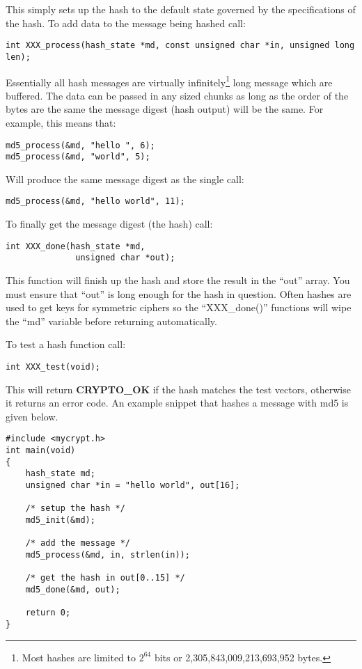 \documentclass[b5paper]{book}
\begin{document}
This simply sets up the hash to the default state governed by the specifications of the hash.  To add data to the 
message being hashed call:
\begin{verbatim}
int XXX_process(hash_state *md, const unsigned char *in, unsigned long len);
\end{verbatim}

Essentially all hash messages are virtually infinitely\footnote{Most hashes are limited to $2^{64}$ bits or 2,305,843,009,213,693,952 bytes.} long message which 
are buffered.  The data can be passed in any sized chunks as long as the order of the bytes are the same the message digest
(hash output) will be the same.  For example, this means that:
\begin{verbatim}
md5_process(&md, "hello ", 6);
md5_process(&md, "world", 5);
\end{verbatim}
Will produce the same message digest as the single call:
\begin{verbatim}
md5_process(&md, "hello world", 11);
\end{verbatim}

To finally get the message digest (the hash) call:
\begin{verbatim}
int XXX_done(hash_state *md, 
              unsigned char *out);
\end{verbatim}

This function will finish up the hash and store the result in the ``out'' array.  You must ensure that ``out'' is long
enough for the hash in question.  Often hashes are used to get keys for symmetric ciphers so the ``XXX\_done()'' functions
will wipe the ``md'' variable before returning automatically.

To test a hash function call:
\begin{verbatim}
int XXX_test(void);
\end{verbatim}

This will return {\bf CRYPTO\_OK} if the hash matches the test vectors, otherwise it returns an error code.  An
example snippet that hashes a message with md5 is given below.
\begin{small}
\begin{verbatim}
#include <mycrypt.h>
int main(void)
{
    hash_state md;
    unsigned char *in = "hello world", out[16];

    /* setup the hash */
    md5_init(&md);

    /* add the message */
    md5_process(&md, in, strlen(in));

    /* get the hash in out[0..15] */
    md5_done(&md, out);

    return 0;
}
\end{verbatim}
\end{small}
\end{document}
